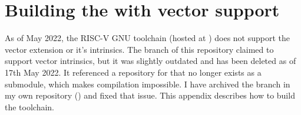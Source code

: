 \chapter{Building the  with vector support}\label{appx:building_rvv_gcc_toolchain}

As of May 2022, the RISC-V GNU toolchain (hosted at ) does not support the vector extension or it's intrinsics.
The  branch of this repository claimed to support vector intrinsics, but it was slightly outdated and has been deleted as of 17th May 2022.
It referenced a repository for  that no longer exists as a submodule, which makes compilation impossible.
I have archived the branch in my own repository () and fixed that issue.
This appendix describes how to build the toolchain.


